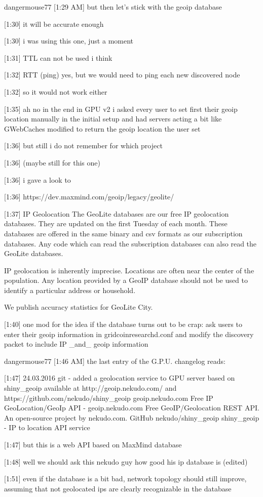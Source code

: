 {dangermouse77 [1:29 AM] 
but then let's stick with the geoip database


[1:30] 
it will be accurate enough


[1:30] 
i was using this one, just a moment


[1:31] 
TTL can not be used i think


[1:32] 
RTT (ping) yes, but we would need to ping each new discovered node


[1:32] 
so it would not work either


[1:35] 
ah no in the end in GPU v2 i asked every user to set first their geoip location manually in the initial setup and had servers acting a bit like GWebCaches modified to return the geoip location the user set


[1:36] 
but still i do not remember for which project


[1:36] 
(maybe still for this one)


[1:36] 
i gave a look to


[1:36] 
https://dev.maxmind.com/geoip/legacy/geolite/


[1:37] 
IP Geolocation
The GeoLite databases are our free IP geolocation databases. They are updated on the first Tuesday of each month. These databases are offered in the same binary and csv formats as our subscription databases. Any code which can read the subscription databases can also read the GeoLite databases.

IP geolocation is inherently imprecise. Locations are often near the center of the population. Any location provided by a GeoIP database should not be used to identify a particular address or household.

We publish accuracy statistics for GeoLite City.


[1:40] 
one mod for the idea if the database turns out to be crap: ask users to enter their geoip information in gridcoinresearchd.conf and modify the discovery packet to include IP _and_ geoip information


dangermouse77 [1:46 AM] 
the last entry of the G.P.U. changelog reads:


[1:47] 
24.03.2016 git
- added a geolocation service to GPU server based on shiny_geoip available at http://geoip.nekudo.com/ and 
https://github.com/nekudo/shiny_geoip
geoip.nekudo.com
Free IP GeoLocation/GeoIp API - geoip.nekudo.com
Free GeoIP/Geolocation REST API. An open-source project by nekudo.com.
 GitHub
nekudo/shiny_geoip
shiny_geoip - IP to location API service
 


[1:47] 
but this is a web API based on MaxMind database


[1:48] 
well we should ask this nekudo guy how good his ip database is (edited)


[1:51] 
even if the database is a bit bad, network topology should still improve, assuming that not geolocated ips are clearly recognizable in the database
}
